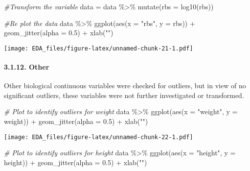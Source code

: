 \documentclass[
]{article}
\newenvironment{Shaded}{\begin{snugshade}}{\end{snugshade}}
\newcommand{\AttributeTok}[1]{\textcolor[rgb]{0.77,0.63,0.00}{#1}}
\newcommand{\CommentTok}[1]{\textcolor[rgb]{0.56,0.35,0.01}{\textit{#1}}}
\newcommand{\FloatTok}[1]{\textcolor[rgb]{0.00,0.00,0.81}{#1}}
\newcommand{\FunctionTok}[1]{\textcolor[rgb]{0.00,0.00,0.00}{#1}}
\newcommand{\NormalTok}[1]{#1}
\newcommand{\OtherTok}[1]{\textcolor[rgb]{0.56,0.35,0.01}{#1}}
\newcommand{\SpecialCharTok}[1]{\textcolor[rgb]{0.00,0.00,0.00}{#1}}
\newcommand{\StringTok}[1]{\textcolor[rgb]{0.31,0.60,0.02}{#1}}
\begin{document}
\begin{Shaded}
\begin{Highlighting}[]
\CommentTok{\#Transform the variable}
\NormalTok{data }\OtherTok{=}\NormalTok{ data }\SpecialCharTok{\%\textgreater{}\%} 
  \FunctionTok{mutate}\NormalTok{(}\AttributeTok{rbs =} \FunctionTok{log10}\NormalTok{(rbs))}

\CommentTok{\#Re plot the data}
\NormalTok{data }\SpecialCharTok{\%\textgreater{}\%} 
  \FunctionTok{ggplot}\NormalTok{(}\FunctionTok{aes}\NormalTok{(}\AttributeTok{x =} \StringTok{"rbs"}\NormalTok{, }\AttributeTok{y =}\NormalTok{ rbs)) }\SpecialCharTok{+}
  \FunctionTok{geom\_jitter}\NormalTok{(}\AttributeTok{alpha =} \FloatTok{0.5}\NormalTok{) }\SpecialCharTok{+}
  \FunctionTok{xlab}\NormalTok{(}\StringTok{""}\NormalTok{)}
\end{Highlighting}
\end{Shaded}

\texttt{[image: EDA\_files/figure-latex/unnamed-chunk-21-1.pdf]}

\hypertarget{other}{%
\paragraph{3.1.12. Other}\label{other}}

Other biological continuous variables were checked for outliers, but in
view of no significant outliers, these variables were not further
investigated or transformed.

\begin{Shaded}
\begin{Highlighting}[]
\CommentTok{\# Plot to identify outliers for weight}
\NormalTok{data }\SpecialCharTok{\%\textgreater{}\%} 
  \FunctionTok{ggplot}\NormalTok{(}\FunctionTok{aes}\NormalTok{(}\AttributeTok{x =} \StringTok{"weight"}\NormalTok{, }\AttributeTok{y =}\NormalTok{ weight)) }\SpecialCharTok{+}
  \FunctionTok{geom\_jitter}\NormalTok{(}\AttributeTok{alpha =} \FloatTok{0.5}\NormalTok{) }\SpecialCharTok{+}
  \FunctionTok{xlab}\NormalTok{(}\StringTok{""}\NormalTok{)}
\end{Highlighting}
\end{Shaded}

\texttt{[image: EDA\_files/figure-latex/unnamed-chunk-22-1.pdf]}

\begin{Shaded}
\begin{Highlighting}[]
\CommentTok{\# Plot to identify outliers for height}
\NormalTok{data }\SpecialCharTok{\%\textgreater{}\%} 
  \FunctionTok{ggplot}\NormalTok{(}\FunctionTok{aes}\NormalTok{(}\AttributeTok{x =} \StringTok{"height"}\NormalTok{, }\AttributeTok{y =}\NormalTok{ height)) }\SpecialCharTok{+}
  \FunctionTok{geom\_jitter}\NormalTok{(}\AttributeTok{alpha =} \FloatTok{0.5}\NormalTok{) }\SpecialCharTok{+}
  \FunctionTok{xlab}\NormalTok{(}\StringTok{""}\NormalTok{)}
\end{Highlighting}
\end{Shaded}
\end{document}
